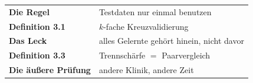 \begin{merksatz}
\begin{center}
\renewcommand{\arraystretch}{1.5}
\begin{tabular}{@{}P{3.0cm}P{5.6cm}@{}}
\toprule
\textbf{Die Regel} & Testdaten nur einmal benutzen\\
\textbf{Definition 3.1} & $k$-fache Kreuzvalidierung\\
\textbf{Das Leck} & alles Gelernte gehört hinein, nicht davor\\
\textbf{Definition 3.3} & Trennschärfe $=$ Paarvergleich\\
\textbf{Die äußere Prüfung} & andere Klinik, andere Zeit\\
\bottomrule
\end{tabular}
\end{center}

\begin{center}
\begin{minipage}{0.88\textwidth}
\end{minipage}
\end{center}
\end{merksatz}
